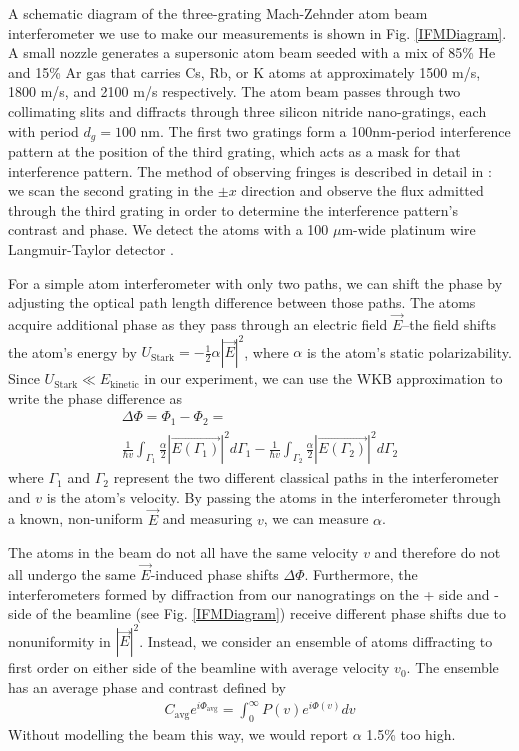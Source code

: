 \documentclass[twocolumn,prl,showpacs,superscriptaddress]{revtex4-1}   %
\newcommand{\abs}[1]{\left|#1\right|}
\newcommand{\figref}[1]{Fig. \ref{#1}}
\begin{document}
A schematic diagram of the three-grating Mach-Zehnder atom beam interferometer we use to make our measurements is shown in \figref{IFMDiagram}. A small nozzle generates a supersonic atom beam \cite{Scoles} \cite{Ekstrom1993} seeded with a mix of 85\% He and 15\% Ar gas that carries Cs, Rb, or K atoms at approximately 1500 m/s, 1800 m/s, and 2100 m/s respectively. 
The atom beam passes through two collimating slits and diffracts through three silicon nitride nano-gratings, each with period $d_g = 100$ nm.
The first two gratings form a 100nm-period interference pattern at the position of the third grating, which acts as a mask for that interference pattern. 
The method of observing fringes is described in detail in \cite{Kokorowski2001}: we scan the second grating in the $\pm x$ direction and observe the flux admitted through the third grating in order to determine the interference pattern's contrast and phase.
We detect the atoms with a 100 $\mu$m-wide platinum wire Langmuir-Taylor detector \cite{Delhuille2002}.

For a simple atom interferometer with only two paths, we can shift the phase by adjusting the optical path length difference between those paths. The atoms acquire additional phase as they pass through an electric field $\vec{E}$--the field shifts the atom's energy by $U_{\mathrm{Stark}} = -\frac{1}{2}\alpha\abs{\vec{E}}^2$, where $\alpha$ is the atom's static polarizability. Since $U_{\mathrm{Stark}} \ll E_{\mathrm{kinetic}}$ in our experiment, we can use the WKB approximation to write the phase difference as
\begin{align}
	\Delta\Phi = \Phi_1 - \Phi_2 = \nonumber \\
	\frac{1}{\hbar v} \int_{\Gamma_1} \frac{\alpha}{2}|\vec{E(\Gamma_1)}|^2 d\Gamma_1 -
	\frac{1}{\hbar v} \int_{\Gamma_2} \frac{\alpha}{2}|\vec{E(\Gamma_2)}|^2 d\Gamma_2
	\label{deltaPhaseGeneral}
\end{align}
where $\Gamma_1$ and $\Gamma_2$ represent the two different classical paths in the interferometer and $v$ is the atom's velocity. By passing the atoms in the interferometer through a known, non-uniform $\vec{E}$ and measuring $v$, we can measure $\alpha$.

The atoms in the beam do not all have the same velocity $v$ and therefore do not all undergo the same $\vec{E}$-induced phase shifts $\Delta\Phi$. Furthermore, the interferometers formed by diffraction from our nanogratings on the + side and - side of the beamline (see \figref{IFMDiagram}) receive different phase shifts due to nonuniformity in $|\vec{E}|^2$. Instead, we consider an ensemble of atoms diffracting to first order on either side of the beamline with average velocity $v_0$. The ensemble has an average phase and contrast defined by 
\begin{align}
	C_{\mathrm{avg}}e^{i\Phi_{\mathrm{avg}}} = \int_0^{\infty} P(v) e^{i \Phi(v)} dv
	\label{velEnsemble}
\end{align}
Without modelling the beam this way, we would report $\alpha$ 1.5\% too high.
\end{document}
